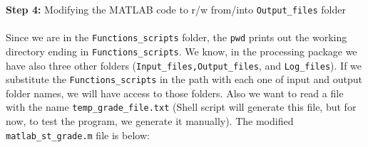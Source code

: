 
\textbf{Step 4:} Modifying the MATLAB code to r/w from/into \texttt{Output\_files} folder\\ \\
\noindent
Since we are in the \texttt{Functions\_scripts} folder, the \texttt{pwd} prints out the working directory ending in \texttt{Functions\_scripts}. We know, in the processing package we have also three other folders (\texttt{Input\_files,Output\_files}, and \texttt{Log\_files}). If we substitute the  \texttt{Functions\_scripts} in the path with each one of input and output folder names, we will have access to those folders. Also we want to read a file with the name \texttt{temp\_grade\_file.txt} (Shell script will generate this file, but for now, to test the program, we generate it manually). The modified \texttt{matlab\_st\_grade.m} file is below:

